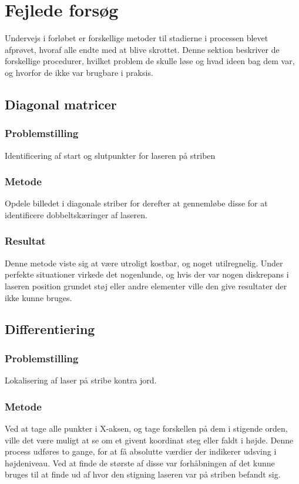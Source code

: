 \section{Fejlede forsøg}
Undervejs i forløbet er forskellige metoder til stadierne i processen blevet afprøvet, hvoraf alle endte med at blive skrottet. Denne sektion beskriver de forskellige procedurer, hvilket problem de skulle løse og hvad ideen bag dem var, og hvorfor de ikke var brugbare i praksis.

\subsection{Diagonal matricer}

\subsubsection{Problemstilling}
Identificering af start og slutpunkter for laseren på striben

\subsubsection{Metode}
Opdele billedet i diagonale striber for derefter at gennemløbe disse for at identificere dobbeltskæringer af laseren.

\subsubsection{Resultat}
Denne metode viste sig at være utroligt kostbar, og noget utilregnelig. Under perfekte situationer virkede det nogenlunde, og hvis der var nogen diskrepans i laseren position grundet støj eller andre elementer ville den give resultater der ikke kunne bruges.

\subsection{Differentiering}

\subsubsection{Problemstilling}
Lokalisering af laser på stribe kontra jord.

\subsubsection{Metode}
Ved at tage alle punkter i X-aksen, og tage forskellen på dem i stigende orden, ville det være muligt at se om et givent koordinat steg eller faldt i højde.
Denne process udføres to gange, for at få absolutte værdier der indikerer udsving i højdeniveau. Ved at finde de største af disse var forhåbningen af det kunne bruges til at finde ud af hvor den stigning laseren var på striben befandt sig.

